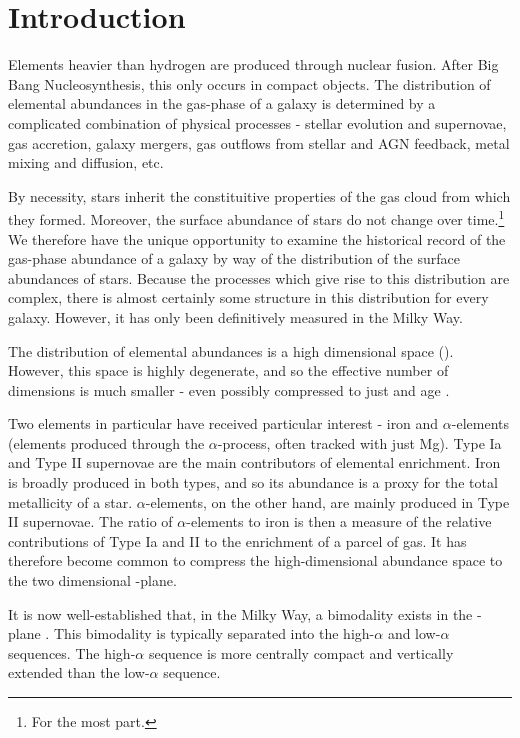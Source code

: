 \section{Introduction} \label{sec:intro}
Elements heavier than hydrogen are produced through nuclear fusion. After Big Bang Nucleosynthesis, this only occurs in compact objects. The distribution of elemental abundances in the gas-phase of a galaxy is determined by a complicated combination of physical processes - stellar evolution and supernovae, gas accretion, galaxy mergers, gas outflows from stellar and AGN feedback, metal mixing and diffusion, etc.

By necessity, stars inherit the constituitive properties of the gas cloud from which they formed. Moreover, the surface abundance of stars do not change over time.\footnote{For the most part.} We therefore have the unique opportunity to examine the historical record of the gas-phase abundance of a galaxy by way of the distribution of the surface abundances of stars. Because the processes which give rise to this distribution are complex, there is almost certainly some structure in this distribution for every galaxy. However, it has only been definitively measured in the Milky Way.

The distribution of elemental abundances is a high dimensional space (). However, this space is highly degenerate, and so the effective number of dimensions is much smaller - even possibly compressed to just \FeH and age \citep{2019ApJ...883..177N}.

Two elements in particular have received particular interest - iron and $\alpha$-elements (elements produced through the $\alpha$-process, often tracked with just Mg). Type Ia and Type II supernovae are the main contributors of elemental enrichment. Iron is broadly produced in both types, and so its abundance is a proxy for the total metallicity of a star. $\alpha$-elements, on the other hand, are mainly produced in Type II supernovae. The ratio of $\alpha$-elements to iron is then a measure of the relative contributions of Type Ia and II to the enrichment of a parcel of gas. It has therefore become common to compress the high-dimensional abundance space to the two dimensional \FeH-\alphaFe plane.

It is now well-established that, in the Milky Way, a bimodality exists in the \alphaFe{}-\FeH{} plane \citep{1996ASPC...92..307G,1998A&A...338..161F,2004AN....325....3F,2006MNRAS.367.1329R,2011A&A...535L..11A,2012A&A...545A..32A,2014A&A...562A..71B,2014ApJ...796...38N,2020MNRAS.493.2952H}. This bimodality is typically separated into the high-$\alpha$ and low-$\alpha$ sequences. The high-$\alpha$ sequence is more centrally compact and vertically extended than the low-$\alpha$ sequence. 

